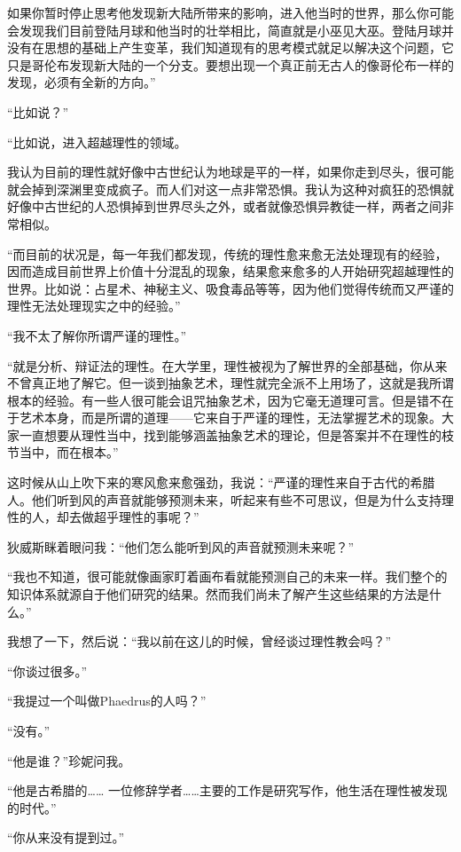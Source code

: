 \documentclass[UTF8]{article}
\begin{document}
\par 如果你暂时停止思考他发现新大陆所带来的影响，进入他当时的世界，那么你可能会发现我们目前登陆月球和他当时的壮举相比，简直就是小巫见大巫。登陆月球并没有在思想的基础上产生变革，我们知道现有的思考模式就足以解决这个问题，它只是哥伦布发现新大陆的一个分支。要想出现一个真正前无古人的像哥伦布一样的发现，必须有全新的方向。”
\par “比如说？”
\par “比如说，进入超越理性的领域。
\par 我认为目前的理性就好像中古世纪认为地球是平的一样，如果你走到尽头，很可能就会掉到深渊里变成疯子。而人们对这一点非常恐惧。我认为这种对疯狂的恐惧就好像中古世纪的人恐惧掉到世界尽头之外，或者就像恐惧异教徒一样，两者之间非常相似。
\par “而目前的状况是，每一年我们都发现，传统的理性愈来愈无法处理现有的经验，因而造成目前世界上价值十分混乱的现象，结果愈来愈多的人开始研究超越理性的世界。比如说：占星术、神秘主义、吸食毒品等等，因为他们觉得传统而又严谨的理性无法处理现实之中的经验。”
\par “我不太了解你所谓严谨的理性。”
\par “就是分析、辩证法的理性。在大学里，理性被视为了解世界的全部基础，你从来不曾真正地了解它。但一谈到抽象艺术，理性就完全派不上用场了，这就是我所谓根本的经验。有一些人很可能会诅咒抽象艺术，因为它毫无道理可言。但是错不在于艺术本身，而是所谓的道理——它来自于严谨的理性，无法掌握艺术的现象。大家一直想要从理性当中，找到能够涵盖抽象艺术的理论，但是答案并不在理性的枝节当中，而在根本。”
\par 这时候从山上吹下来的寒风愈来愈强劲，我说：“严谨的理性来自于古代的希腊人。他们听到风的声音就能够预测未来，听起来有些不可思议，但是为什么支持理性的人，却去做超乎理性的事呢？”
\par 狄威斯眯着眼问我：“他们怎么能听到风的声音就预测未来呢？”
\par “我也不知道，很可能就像画家盯着画布看就能预测自己的未来一样。我们整个的知识体系就源自于他们研究的结果。然而我们尚未了解产生这些结果的方法是什么。”
\par 我想了一下，然后说：“我以前在这儿的时候，曾经谈过理性教会吗？”
\par “你谈过很多。”
\par “我提过一个叫做Phaedrus的人吗？”
\par “没有。”
\par “他是谁？”珍妮问我。
\par “他是古希腊的…… 一位修辞学者……主要的工作是研究写作，他生活在理性被发现的时代。”
\par “你从来没有提到过。”
\end{document}
